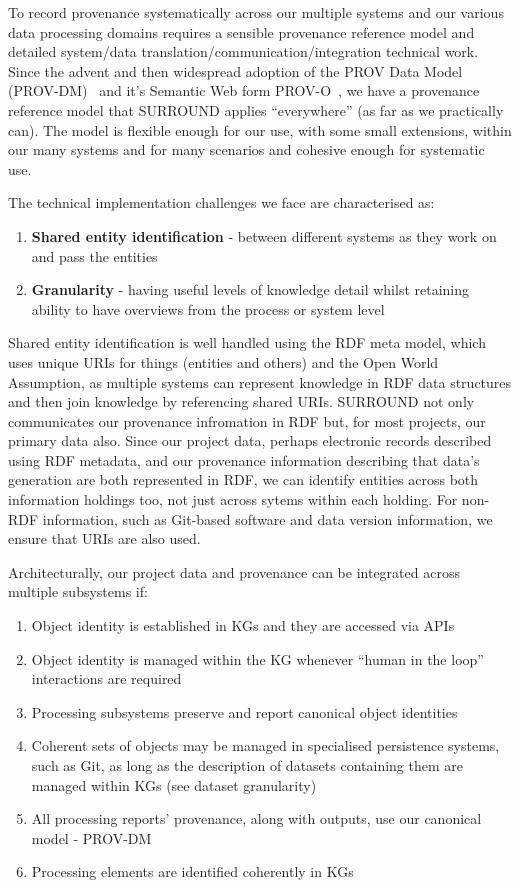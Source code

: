 \documentclass[letterpaper,twocolumn,10pt]{article}
\begin{document}
To record provenance systematically across our multiple systems and our various data processing domains requires a sensible provenance
reference model and detailed system/data translation/communication/integration technical work. Since the advent and then widespread 
adoption of the PROV Data Model (PROV-DM)~\cite{moreau_prov-dm_2013} and it's Semantic Web form PROV-O~\cite{lebo_prov-o:_2013}, we 
have a provenance reference model that SURROUND applies ``everywhere'' (as far as we practically can). The model is flexible enough
for our use, with some small extensions, within our many systems and for many scenarios and cohesive enough for systematic use.

The technical implementation challenges we face are characterised as:

\begin{enumerate}
  \item \textbf{Shared entity identification} - between different systems as they work on and pass the entities
  \item \textbf{Granularity} - having useful levels of knowledge detail whilst retaining ability to have overviews from the process or system level
\end{enumerate}

Shared entity identification is well handled using the RDF meta model, which uses unique URIs for things (entities and others) and 
the Open World Assumption, as multiple systems can represent knowledge in RDF data structures and then join knowledge by referencing 
shared URIs. SURROUND not only communicates our provenance infromation in RDF but, for most projects, our primary data also. Since 
our project data, perhaps electronic records described using RDF metadata, and our provenance information describing that data's 
generation are both represented in RDF, we can identify entities across both information holdings too, not just across sytems within 
each holding. For non-RDF information, such as Git-based software and data version information, we ensure that URIs are also used.

Architecturally, our project data and provenance can be integrated across multiple subsystems if:

\begin{enumerate}
  \item Object identity is established in KGs and they are accessed via APIs
  \item Object identity is managed within the KG whenever ``human in the loop'' interactions are required
  \item Processing subsystems preserve and report canonical object identities
  \item Coherent sets of objects may be managed in specialised persistence systems, such as Git, as long as the description of datasets containing them are managed within KGs (see dataset granularity)
  \item All processing reports' provenance, along with outputs, use our canonical model - PROV-DM
  \item Processing elements are identified coherently in KGs
\end{enumerate}
\end{document}
